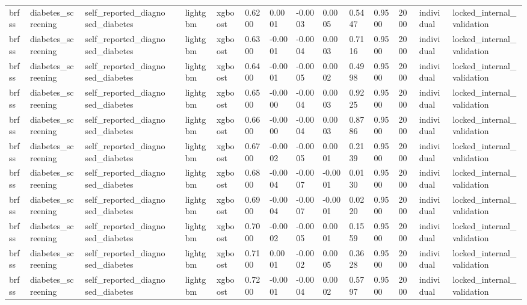 \begin{tabular}{lllllllllllllll}
brfss & diabetes\_screening & self\_reported\_diagnosed\_diabetes &  & lightgbm & xgboost & 0.6200 & 0.0001 & -0.0003 & 0.0005 & 0.5447 & 0.9500 & 2000 & individual & locked\_internal\_validation \\
brfss & diabetes\_screening & self\_reported\_diagnosed\_diabetes &  & lightgbm & xgboost & 0.6300 & -0.0001 & -0.0004 & 0.0003 & 0.7116 & 0.9500 & 2000 & individual & locked\_internal\_validation \\
brfss & diabetes\_screening & self\_reported\_diagnosed\_diabetes &  & lightgbm & xgboost & 0.6400 & -0.0001 & -0.0005 & 0.0002 & 0.4998 & 0.9500 & 2000 & individual & locked\_internal\_validation \\
brfss & diabetes\_screening & self\_reported\_diagnosed\_diabetes &  & lightgbm & xgboost & 0.6500 & -0.0000 & -0.0004 & 0.0003 & 0.9225 & 0.9500 & 2000 & individual & locked\_internal\_validation \\
brfss & diabetes\_screening & self\_reported\_diagnosed\_diabetes &  & lightgbm & xgboost & 0.6600 & -0.0000 & -0.0004 & 0.0003 & 0.8786 & 0.9500 & 2000 & individual & locked\_internal\_validation \\
brfss & diabetes\_screening & self\_reported\_diagnosed\_diabetes &  & lightgbm & xgboost & 0.6700 & -0.0002 & -0.0005 & 0.0001 & 0.2139 & 0.9500 & 2000 & individual & locked\_internal\_validation \\
brfss & diabetes\_screening & self\_reported\_diagnosed\_diabetes &  & lightgbm & xgboost & 0.6800 & -0.0004 & -0.0007 & -0.0001 & 0.0130 & 0.9500 & 2000 & individual & locked\_internal\_validation \\
brfss & diabetes\_screening & self\_reported\_diagnosed\_diabetes &  & lightgbm & xgboost & 0.6900 & -0.0004 & -0.0007 & -0.0001 & 0.0220 & 0.9500 & 2000 & individual & locked\_internal\_validation \\
brfss & diabetes\_screening & self\_reported\_diagnosed\_diabetes &  & lightgbm & xgboost & 0.7000 & -0.0002 & -0.0005 & 0.0001 & 0.1559 & 0.9500 & 2000 & individual & locked\_internal\_validation \\
brfss & diabetes\_screening & self\_reported\_diagnosed\_diabetes &  & lightgbm & xgboost & 0.7100 & 0.0001 & -0.0002 & 0.0005 & 0.3628 & 0.9500 & 2000 & individual & locked\_internal\_validation \\
brfss & diabetes\_screening & self\_reported\_diagnosed\_diabetes &  & lightgbm & xgboost & 0.7200 & -0.0001 & -0.0004 & 0.0002 & 0.5797 & 0.9500 & 2000 & individual & locked\_internal\_validation \\

\end{tabular}
